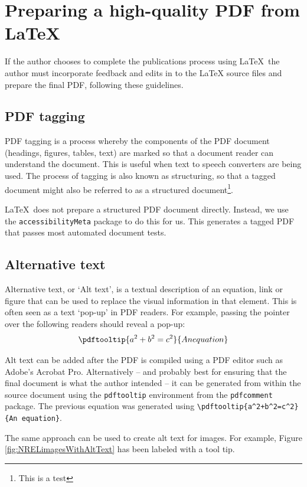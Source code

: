 \chapter{Preparing a high-quality PDF from LaTeX}\label{chap:PDFprep}
If the author chooses to complete the publications process using LaTeX\, the author must incorporate feedback and edits in to the LaTeX source files and prepare the final PDF, following these guidelines.

\section{PDF tagging}\label{sec:PDFtagging}
PDF tagging is a process whereby the components of the PDF document (headings, figures, tables, text) are marked so that a document reader can understand the document. This is useful when text to speech converters are being used. The process of tagging is also known as structuring, so that a tagged document might also be referred to as a structured document\footnote{This is a test}.

\LaTeX\ does not prepare a structured PDF document directly. Instead, we use the \texttt{accessibilityMeta} package to do this for us. This generates a tagged PDF that passes most automated document tests.

\section{Alternative text}\label{sec:Alttext}
Alternative text, or `Alt text', is a textual description of an equation, link or figure that can be used to replace the visual information in that element. This is often seen as a text `pop-up' in PDF readers. For example, passing the pointer over the following readers should reveal a pop-up:
\begin{equation}
\pdftooltip{a^2+b^2=c^2}{An equation}
\end{equation}

Alt text can be added after the PDF is compiled using a PDF editor such as Adobe's Acrobat Pro. Alternatively -- and probably best for ensuring that the final document is what the author intended -- it can be generated from within the source document using the \texttt{pdftooltip} environment from the \texttt{pdfcomment} package. The previous equation was generated using \verb?\pdftooltip{a^2+b^2=c^2}{An equation}?.

The same approach can be used to create alt text for images. For example, Figure \ref{fig:NRELimagesWithAltText} has been labeled with a tool tip. 

